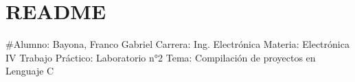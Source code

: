 \chapter{README}
\hypertarget{md__r_e_a_d_m_e}{}\label{md__r_e_a_d_m_e}
\#\+Alumno\+: Bayona, Franco Gabriel Carrera\+: Ing. Electrónica Materia\+: Electrónica IV Trabajo Práctico\+: Laboratorio n°2 Tema\+: Compilación de proyectos en Lenguaje C 